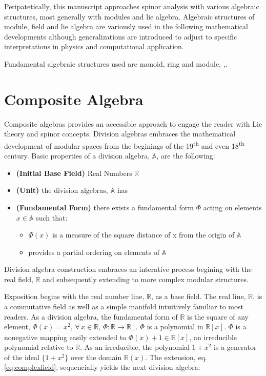 \documentclass[aps,twocolumn,secnumarabic,nobalancelastpage,amsmath,amssymb,
nofootinbib,parskip=full]{revtex4}
\begin{document}
Peripatetically, this manuscript approaches spinor analysis
with various algebraic structures, most generally with modules and lie algebra.
Algebraic structures of module, field and lie algebra are variously used
in the following mathematical developments although generalizations are
introduced to adjust to specific interpretations in physics and
computational application.

Fundamental algebraic structures used are monoid, ring and module,
\cite{rotman1998},\cite{lang2002}.


\section{Composite Algebra}

Composite algebras provides an accessible approach to engage the reader
with Lie theory and spinor concepts. Division algebras
embraces the mathematical development of modular spaces
from the beginings of the 19\textsuperscript{th} and
even 18\textsuperscript{th} century. Basic properties of
a division algebra, $\mathbb{A}$, are the following:

\begin{itemize}
\item \textbf{\small (Initial Base Field)} Real Numbers $\mathbb{R}$
\item \textbf{\small (Unit)} the division algebras, $\mathbb{A}$ has
\item \textbf{\small (Fundamental Form)} there exists a fundamental form $\Phi$
  acting on elements $x\in\mathbb{A}$ such that:
  \begin{itemize}
  \item $\Phi(x)$ is a measure of the square distance of
    x from the origin of $\mathbb{A}$
  \item  provides a partial ordering on elements of $\mathbb{A}$
  \end{itemize}
\end{itemize}

Division algebra construction embraces an interative process begining
with the real field, $\mathbb{R}$ and subsequently extending
to more complex modular structures.

Exposition begins with the real number line, $\mathbb{R}$,
as a base field. The real line, $\mathbb{R}$, is a commutative field
as well as a simple manifold intuitively familiar to most readers.
As a division algebra, the fundamental form of $\mathbb{R}$ is the
square of any element, $\Phi(x)=x^2,\,\forall\, x\in\mathbb{R}$,
$\Phi:\mathbb{R}\rightarrow\mathbb{R}_+$. $\Phi$ is a polynomial
in $\mathbb{R}[x]$. $\Phi$ is a nonegative mapping easily
extended to $\Phi(x)+1\in\mathbb{R}[x]$, an irreducible polynomial
relative to $\mathbb{R}$.
As an irreducible, the polynomial $1+x^2$ is a generator of
the ideal $\{1+x^2\}$ over the domain $\mathbb{R}(x)$.
The extension, eq. \ref{eq:complexfield}, sequencially yields the next
division algebra:
\end{document}
